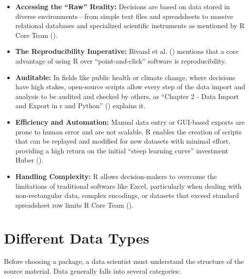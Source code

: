 \documentclass[
  doc,
  longtable,
  a4paper,
  nolmodern,
  notxfonts,
  notimes,
  colorlinks=true,linkcolor=blue,citecolor=blue,urlcolor=blue]{apa7}
\begin{document}
\begin{itemize}
\item
  \textbf{Accessing the ``Raw'' Reality:} Decisions are based on data
  stored in diverse environments---from simple text files and
  spreadsheets to massive relational databases and specialized
  scientific instruments as mentioned by R Core Team
  ().
\item
  \textbf{The Reproducibility Imperative:} Bivand et al.
  () mentions that a core
  advantage of using R over ``point-and-click'' software is
  reproducibility.
\item
  \textbf{Auditable:} In fields like public health or climate change,
  where decisions have high stakes, open-source scripts allow every step
  of the data import and analysis to be audited and checked by others,
  as {``Chapter 2 - Data Import and Export in r and Python''}
  () explains it.
\item
  \textbf{Efficiency and Automation:} Manual data entry or GUI-based
  exports are prone to human error and are not scalable. R enables the
  creation of scripts that can be replayed and modified for new datasets
  with minimal effort, providing a high return on the initial ``steep
  learning curve'' investment Huber ().
\item
  \textbf{Handling Complexity:} R allows decision-makers to overcome the
  limitations of traditional software like Excel, particularly when
  dealing with non-rectangular data, complex encodings, or datasets that
  exceed standard spreadsheet row limits R Core Team
  ().
\end{itemize}

\section{Different Data Types}\label{different-data-types}

Before choosing a package, a data scientist must understand the
structure of the source material. Data generally falls into several
categories:
\end{document}
